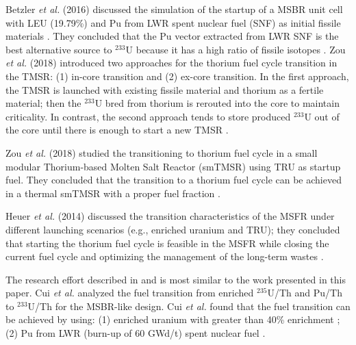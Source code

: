 Betzler \emph{et al.} (2016) discussed the simulation of the startup of a \gls{MSBR} unit
cell with \gls{LEU} (19.79\%) and Pu from \gls{LWR} spent nuclear fuel (SNF) as initial
fissile materials \cite{betzler2016modeling}. They concluded that the 
Pu vector extracted from LWR SNF is the best alternative source to 
$^{233}$U because it has a high ratio of fissile isotopes
\cite{betzler2016modeling}. Zou \emph{et al.} (2018) introduced two approaches for
the thorium fuel cycle transition in the \gls{TMSR}: (1) in-core transition and 
(2) ex-core transition. In the first approach, the TMSR is launched with 
existing fissile material and thorium as a fertile material; then the 
$^{233}$U bred from thorium is rerouted into the core to maintain criticality. 
In contrast, the second approach tends to store produced $^{233}$U out of the 
core until there is enough to start a new TMSR \cite{zou2018transition}.

Zou \emph{et al.} (2018) studied the transitioning to thorium fuel
cycle in a small modular Thorium-based Molten Salt Reactor (smTMSR) using \gls{TRU}
as startup fuel. They concluded that the transition to a thorium fuel cycle can
be achieved in a thermal smTMSR with a proper fuel fraction 
\cite{zou2018preliminary}.

Heuer \emph{et al.} (2014) discussed the transition characteristics of the \gls{MSFR}
under different launching scenarios (e.g., enriched uranium and TRU); they concluded that starting the thorium fuel cycle is feasible in the MSFR while closing the current fuel cycle and optimizing the management of the long-term wastes \cite{heuer2014towards}.

The research effort described in \cite{cui2017transition} and
\cite{cui2018possible} is most similar to the work
presented in this paper. Cui \emph{et al.} analyzed the fuel transition from 
enriched $^{235}$U/Th and Pu/Th to $^{233}$U/Th for the MSBR-like design. Cui 
\emph{et al.} found that the fuel transition can be achieved by using: (1) 
enriched uranium with greater than 40\% enrichment \cite{cui2018possible}; (2) 
Pu from LWR (burn-up of 60 GWd/t) spent nuclear fuel \cite{cui2017transition, 
cui2018possible}.
 
